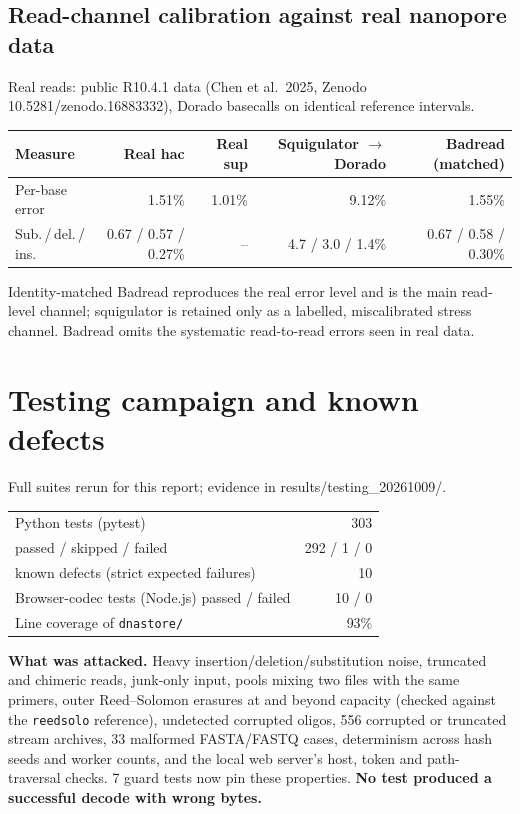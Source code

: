 \documentclass[11pt,a4paper]{article}
\newcommand{\pageheading}[2]{\clearpage\section{#1}{\color{muted}\small #2}\par\vspace{5pt}}
\begin{document}
\subsection*{Read-channel calibration against real nanopore data}
Real reads: public R10.4.1 data (Chen et al.\ 2025, Zenodo 10.5281/zenodo.16883332),
Dorado basecalls on identical reference intervals.
\begin{center}\small
\begin{tabular}{lrrrr}
\toprule
Measure & Real hac & Real sup & Squigulator $\to$ Dorado & Badread (matched)\\
\midrule
Per-base error & 1.51\% & 1.01\% & 9.12\% & 1.55\% \\
Sub.\,/\,del.\,/\,ins. & 0.67 / 0.57 / 0.27\% & -- & 4.7 / 3.0 / 1.4\% & 0.67 / 0.58 / 0.30\% \\
\bottomrule
\end{tabular}
\end{center}
Identity-matched Badread reproduces the real error level and is the main read-level
channel; squigulator is retained only as a labelled, miscalibrated stress channel.
Badread omits the systematic read-to-read errors seen in real data.

\pageheading{Testing campaign and known defects}{Full suites rerun for this report; evidence in results/testing\_20261009/.}
\begin{center}\small
\begin{tabular}{lr}
\toprule
Python tests (pytest) & 303\\
\quad passed / skipped / failed & 292 / 1 / 0\\
\quad known defects (strict expected failures) & 10\\
Browser-codec tests (Node.js) passed / failed & 10 / 0\\
Line coverage of \texttt{dnastore/} & 93\%\\
\bottomrule
\end{tabular}
\end{center}
\textbf{What was attacked.} Heavy insertion/deletion/substitution noise, truncated and
chimeric reads, junk-only input, pools mixing two files with the same primers, outer
Reed--Solomon erasures at and beyond capacity (checked against the \texttt{reedsolo}
reference), undetected corrupted oligos, 556 corrupted or truncated stream archives,
33 malformed FASTA/FASTQ cases, determinism across hash seeds and worker counts, and the
local web server's host, token and path-traversal checks. 7 guard tests now
pin these properties. \textbf{No test produced a successful decode with wrong bytes.}
\end{document}
